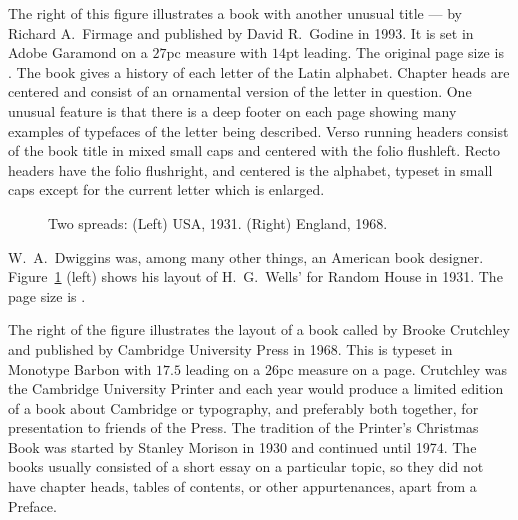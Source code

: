 \documentclass[10pt,letterpaper,extrafontsizes]{memoir}
\begin{document}
The right of this figure illustrates a book with another unusual title ---
 by Richard A.~Firmage and published by
David R.~Godine in 1993. It is set in 
Adobe Garamond on a $27$pc measure
with $14$pt leading. The original page size is . The
book gives a history of each letter of the Latin alphabet. 
Chapter heads are centered and consist of an 
ornamental version of the letter in question. One
unusual feature is that there is a deep footer 
on each page showing many examples of typefaces of the letter being 
described. Verso running headers consist of the book
title in mixed small caps and centered with the folio flushleft.
Recto headers have the folio flushright, and centered is the alphabet, 
typeset in small caps except for the current letter which is enlarged.


\begin{figure}
\centering
\begin{minipage}[b]{\pwlayi}
\end{minipage}
\hfill
\begin{minipage}[b]{\pwlayi}
\end{minipage}
\caption[Two spreads: USA, 1931 and England, 1968]%
        {Two spreads: (Left) USA, 1931.
         (Right) England, 1968.} \label{fb:6}
\end{figure}


    W.~A.~Dwiggins was, among many other things, an American book designer.
Figure~\ref{fb:6} (left) shows his layout of H.~G.~Wells'  for Random House in 1931. The page size is .

The right of the figure illustrates the layout of a book called 
by Brooke Crutchley 
and published by Cambridge University 
Press in 1968. This is typeset in 
Monotype Barbon
with $17.5$ leading on a $26$pc measure on a  page.
Crutchley was the Cambridge University 
Printer and each year would produce
a limited edition of a book about Cambridge or typography, and preferably
both together, for presentation to friends of the Press. The tradition of
the Printer's Christmas Book 
was started by Stanley 
Morison 
in 1930 and continued until 1974. The books usually consisted of a short 
essay on a
particular topic, so they did not have chapter heads, tables of contents,
or other appurtenances, apart from a Preface.
\end{document}
